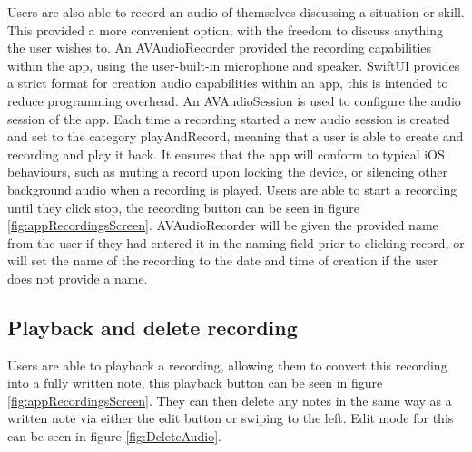 \documentclass{l4proj}
\begin{document}
Users are also able to record an audio of themselves discussing a situation or skill. This provided a more convenient option, with the freedom to discuss anything the user wishes to. An AVAudioRecorder provided the recording capabilities within the app, using the user-built-in microphone and speaker. SwiftUI provides a strict format for creation audio capabilities within an app, this is intended to reduce programming overhead. An AVAudioSession is used to configure the audio session of the app. Each time a recording started a new audio session is created and set to the category playAndRecord, meaning that a user is able to create and recording and play it back. It ensures that the app will conform to typical iOS behaviours, such as muting a record upon locking the device, or silencing other background audio when a recording is played. 
Users are able to start a recording until they click stop, the recording button can be seen in figure \ref{fig:appRecordingsScreen}. AVAudioRecorder will be given the provided name from the user if they had entered it in the naming field prior to clicking record, or will set the name of the recording to the date and time of creation if the user does not provide a name. 

\subsection{Playback and delete recording}

Users are able to playback a recording, allowing them to convert this recording into a fully written note, this playback button can be seen in figure \ref{fig:appRecordingsScreen}. They can then delete any notes in the same way as a written note via either the edit button or swiping to the left. Edit mode for this can be seen in figure \ref{fig:DeleteAudio}.
\end{document}
